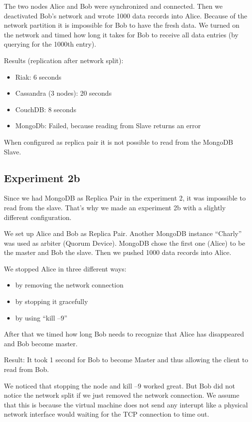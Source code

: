The two nodes Alice and Bob were synchronized and connected. Then
we deactivated Bob's network and wrote 1000 data records into
Alice. Because of the network partition it is impossible for Bob to
have the fresh data. We turned on the network and timed how long it
takes for Bob to receive all data entries (by querying for the
1000th entry).

Results (replication after network split):

\begin{itemize}
\item
  Riak: 6 seconds
\item
  Cassandra (3 nodes): 20 seconds
\item
  CouchDB: 8 seconds
\item
  MongoDb: Failed, because reading from Slave returns an error
\end{itemize}
When configured as replica pair it is not possible to read from the
MongoDB Slave.

\subsection{Experiment 2b}

Since we had MongoDB as Replica Pair in the experiment 2, it was
impossible to read from the slave. That's why we made an experiment
2b with a slightly different configuration.

We set up Alice and Bob as Replica Pair. Another MongoDB instance
``Charly'' was used as arbiter (Quorum Device). MongoDB chose the
first one (Alice) to be the master and Bob the slave. Then we
pushed 1000 data records into Alice.

We stopped Alice in three different ways:

\begin{itemize}
\item
  by removing the network connection
\item
  by stopping it gracefully
\item
  by using ``kill --9''
\end{itemize}
After that we timed how long Bob needs to recognize that Alice has
disappeared and Bob become master.

Result: It took 1 second for Bob to become Master and thus allowing
the client to read from Bob.

We noticed that stopping the node and kill --9 worked great. But
Bob did not notice the network split if we just removed the network
connection. We assume that this is because the virtual machine does
not send any interupt like a physical network interface would
waiting for the TCP connection to time out.

